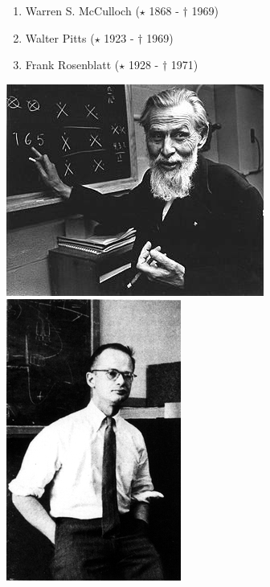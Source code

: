 \documentclass[10pt,journal,compsoc]{IEEEtran}
\begin{document}
\begin{enumerate}
    \item Warren S. McCulloch ($\star$ 1868 - $\dagger$ 1969) \\ 
    \item Walter Pitts ($\star$ 1923 - $\dagger$ 1969) \\ 
    \item Frank Rosenblatt ($\star$ 1928 - $\dagger$ 1971) \\ 
\end{enumerate}
\includegraphics[scale=0.37]{figs/a-1mcculloch.jpeg}
\includegraphics[scale=0.278]{figs/a-2pitts.jpg}
\end{document}
